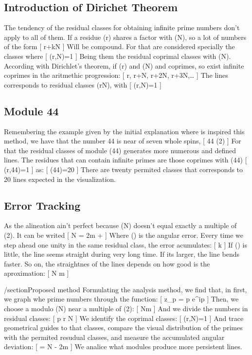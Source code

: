 \documentclass[11pt]{article}
\begin{document}
\subsection{Introduction of Dirichet Theorem}
The tendency of the residual classes for obtaining infinite prime numbers don't apply to all of them.
If a residue (r) shares a factor with (N), so a lot of numbers of the form
[
r+kN
]
Will be compound. For that are considered specially the classes where 
[
\gcd(r,N)=1
]
Being them the residual coprimal classes with (N). 
According with Dirichlet's theorem, if (r) and (N) and coprimes, so exist infinite coprimes 
in the aritmethic progression:
[
r, r+N, r+2N, r+3N,\dots
]
The lines corresponds to residual classes (r\pmod N), with
[
\gcd(r,N)=1
]
\subsection{Module 44}
Remembering the example given by the initial explanation where is inspired this method, 
we have that the number 44 is near of seven whole spins,
[
44 (2\pi)
]
For that the residual classes of module (44) generates more numerous and defined lines.
The residues that can contain infinite primes are those coprimes with (44)
[
\gcd(r,44)=1
]
as:
[
\varphi(44)=20
]
There are twenty permited classes that corresponds to 20 lines expected in the visualization. 
\subsection{Error Tracking}
As the alineation ain't perfect because (N) doesn't equal exactly a multiple of (2\pi). It can be writed
[
N = 2\pi m + \varepsilon
]
Where (\varepsilon) is the angular error. Every time we step ahead one unity in the same residual class, the error acumulates:
[
k\varepsilon
]
If (\varepsilon) is little, the line seems straight during very long time. If its larger, the line bends faster.
So on, the straightnes of the lines depends on how good is the aproximation:
[
N \pi m
]

/section{Proposed method}
Formulating the analysis method, we find that, in first, we graph whe prime numbers through the function:
[
z_p = p e^{ip}
]
Then, we choose a modulo (N) near a multiple of (2\pi):
[
    N\pi m
]
And we divide the numbers in residual classes:
[
p \equiv r \pmod N
]
We identify the coprimal classes:
[
\gcd(r,N)=1
]
And trace geometrical guides to that classes, compare the visual distribution of the primes with the permited resudual classes, and measure the accumulated angular deviation:
[
\varepsilon = N - 2\pi m
]
We analice what modules produce more persistent lines.
%
%
\end{document}

